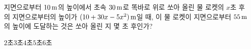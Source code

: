 지면으로부터 $10\mkern3mu \mathrm{m}$의 높이에서 초속 $30\mkern3mu \mathrm{m}$로 똑바로 위로 쏘아 올린 물 로켓의 $x$초 후의 지면으로부터의 높이가 $(10+30x-5x^2)\mkern3mu \mathrm{m}$일 때, 이 물 로켓이 지면으로부터 $55\mkern3mu \mathrm{m}$의 높이에 도달하는 것은 쏘아 올린 지 몇 초 후인가?
\begin{choices32}{$2$초}{$3$초}{$4$초}{$5$초}{$6$초}\end{choices32}
